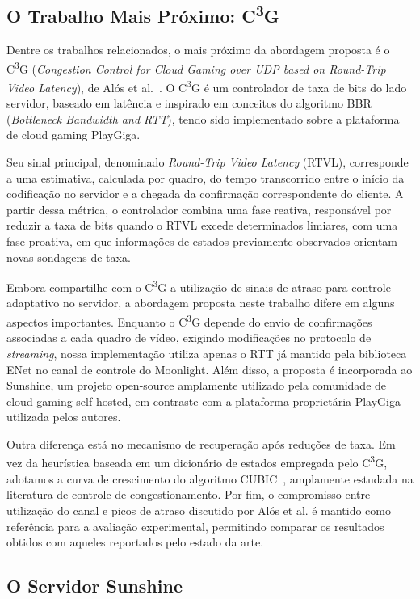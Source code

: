 \subsection{O Trabalho Mais Próximo: C\textsuperscript{3}G}

Dentre os trabalhos relacionados, o mais próximo da abordagem proposta é o C\textsuperscript{3}G (\emph{Congestion Control for Cloud Gaming over UDP based on Round-Trip Video Latency}), de Alós et al.~\cite{alos2019}. O C\textsuperscript{3}G é um controlador de taxa de bits do lado servidor, baseado em latência e inspirado em conceitos do algoritmo BBR (\emph{Bottleneck Bandwidth and RTT}), tendo sido implementado sobre a plataforma de cloud gaming PlayGiga.

Seu sinal principal, denominado \emph{Round-Trip Video Latency} (RTVL), corresponde a uma estimativa, calculada por quadro, do tempo transcorrido entre o início da codificação no servidor e a chegada da confirmação correspondente do cliente. A partir dessa métrica, o controlador combina uma fase reativa, responsável por reduzir a taxa de bits quando o RTVL excede determinados limiares, com uma fase proativa, em que informações de estados previamente observados orientam novas sondagens de taxa.

Embora compartilhe com o C\textsuperscript{3}G a utilização de sinais de atraso para controle adaptativo no servidor, a abordagem proposta neste trabalho difere em alguns aspectos importantes. Enquanto o C\textsuperscript{3}G depende do envio de confirmações associadas a cada quadro de vídeo, exigindo modificações no protocolo de \emph{streaming}, nossa implementação utiliza apenas o RTT já mantido pela biblioteca ENet no canal de controle do Moonlight. Além disso, a proposta é incorporada ao Sunshine, um projeto open-source amplamente utilizado pela comunidade de cloud gaming self-hosted, em contraste com a plataforma proprietária PlayGiga utilizada pelos autores.

Outra diferença está no mecanismo de recuperação após reduções de taxa. Em vez da heurística baseada em um dicionário de estados empregada pelo C\textsuperscript{3}G, adotamos a curva de crescimento do algoritmo CUBIC~\cite{cubic}, amplamente estudada na literatura de controle de congestionamento. Por fim, o compromisso entre utilização do canal e picos de atraso discutido por Alós et al. é mantido como referência para a avaliação experimental, permitindo comparar os resultados obtidos com aqueles reportados pelo estado da arte.

\subsection{O Servidor Sunshine}

